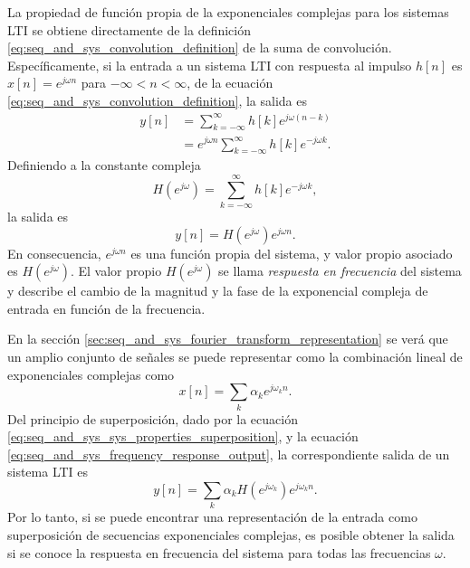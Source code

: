 \documentclass[a4paper]{report}
\begin{document}
La propiedad de función propia de la exponenciales complejas para los sistemas LTI se obtiene directamente de la definición \ref{eq:seq_and_sys_convolution_definition} de la suma de convolución. Específicamente, si la entrada a un sistema LTI con respuesta al impulso \(h[n]\) es \(x[n]=e^{j\omega n}\) para \(-\infty<n<\infty\), de la ecuación \ref{eq:seq_and_sys_convolution_definition}, la salida es
\begin{align*}
 y[n]&=\sum_{k=-\infty}^{\infty}h[k]e^{j\omega(n-k)}\\
   &=e^{j\omega n}\sum_{k=-\infty}^{\infty}h[k]e^{-j\omega k}.
\end{align*}
Definiendo a la constante compleja
\begin{equation}\label{eq:seq_and_sys_frequency_response_definition}
 H(e^{j\omega})=\sum_{k=-\infty}^{\infty}h[k]e^{-j\omega k}, 
\end{equation}
la salida es
\begin{equation}\label{eq:seq_and_sys_frequency_response_output}
 y[n]=H(e^{j\omega})e^{j\omega n}. 
\end{equation}
En consecuencia, \(e^{j\omega n}\) es una función propia del sistema, y valor propio asociado es \(H(e^{j\omega})\). El valor propio \(H(e^{j\omega})\) se llama \emph{respuesta en frecuencia} del sistema y describe el cambio de la magnitud y la fase de la exponencial compleja de entrada en función de la frecuencia.

En la sección \ref{sec:seq_and_sys_fourier_transform_representation} se verá que un amplio conjunto de señales se puede representar como la combinación lineal de exponenciales complejas como
\begin{equation}\label{eq:seq_and_sys_complex_exponential_linear_combination}
 x[n]=\sum_k\alpha_k e^{j\omega_kn}. 
\end{equation}
Del principio de superposición, dado por la ecuación \ref{eq:seq_and_sys_sys_properties_superposition}, y la ecuación \ref{eq:seq_and_sys_frequency_response_output}, la correspondiente salida de un sistema LTI es
\[
 y[n]=\sum_k\alpha_kH(e^{j\omega_k})e^{j\omega_kn}.
\]
Por lo tanto, si se puede encontrar una representación de la entrada como superposición de secuencias exponenciales complejas, es posible obtener la salida si se conoce la respuesta en frecuencia del sistema para todas las frecuencias \(\omega\).
\end{document}
